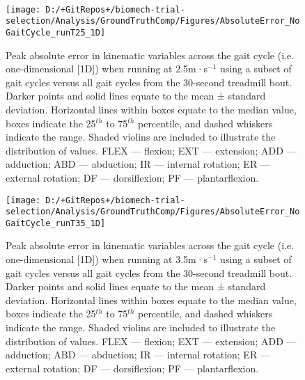 \documentclass[]{elsarticle} %
\begin{document}
~

\begin{figure}

{\centering \texttt{[image: D:/+GitRepos+/biomech-trial-selection/Analysis/GroundTruthComp/Figures/AbsoluteError\_NoGaitCycle\_runT25\_1D]} 

}

\caption{Peak absolute error in kinematic variables across the gait cycle (i.e. one-dimensional [1D]) when running at 2.5m·s$^{-1}$ using a subset of gait cycles versus all gait cycles from the 30-second treadmill bout. Darker points and solid lines equate to the mean ± standard deviation. Horizontal lines within boxes equate to the median value, boxes indicate the 25$^{th}$ to 75$^{th}$ percentile, and dashed whiskers indicate the range. Shaded violins are included to illustrate the distribution of values. FLEX — flexion; EXT — extension; ADD — adduction; ABD — abduction; IR — internal rotation; ER — external rotation; DF — dorsiflexion; PF — plantarflexion.}\label{fig:groundTruthError_runT25_1D}
\end{figure}

\begin{figure}

{\centering \texttt{[image: D:/+GitRepos+/biomech-trial-selection/Analysis/GroundTruthComp/Figures/AbsoluteError\_NoGaitCycle\_runT35\_1D]} 

}

\caption{Peak absolute error in kinematic variables across the gait cycle (i.e. one-dimensional [1D]) when running at 3.5m·s$^{-1}$ using a subset of gait cycles versus all gait cycles from the 30-second treadmill bout. Darker points and solid lines equate to the mean ± standard deviation. Horizontal lines within boxes equate to the median value, boxes indicate the 25$^{th}$ to 75$^{th}$ percentile, and dashed whiskers indicate the range. Shaded violins are included to illustrate the distribution of values. FLEX — flexion; EXT — extension; ADD — adduction; ABD — abduction; IR — internal rotation; ER — external rotation; DF — dorsiflexion; PF — plantarflexion.}\label{fig:groundTruthError_runT35_1D}
\end{figure}
\end{document}

